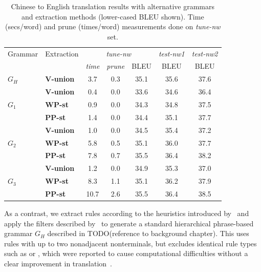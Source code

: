 \begin{table}
  \begin{center}
    \begin{tabular}{|l|l||c|c|c||c||c|}
      \hline
      Grammar & Extraction & \multicolumn{3}{|c||}{{\em tune-nw}} & {\em test-nw1} & {\em test-nw2} \\  \cline{3-7}
      &            & {\em time} & {\em prune} & BLEU & BLEU & BLEU \\ \hline
      $G_H$ & {\bf V-union} & 3.7 & 0.3 & 35.1 & 35.6 & 37.6  \\
      \hline
      & {\bf V-union} & 0.4 & 0.0 & 33.6 & 34.6 & 36.4  \\
      $G_1$ & {\bf WP-st} & 0.9 & 0.0  & 34.3 & 34.8 & 37.5  \\
      & {\bf PP-st} & 1.4 & 0.0 & 34.4 & 35.1 & 37.7   \\
      \hline
      & {\bf V-union} & 1.0 & 0.0 & 34.5  & 35.4  & 37.2   \\
      $G_2$ & {\bf WP-st} & 5.8 & 0.5 & 35.1 & 36.0  & 37.7   \\
      & {\bf PP-st} & 7.8 & 0.7 & 35.5 & 36.4  & 38.2   \\
      \hline
      & {\bf V-union} & 1.2 & 0.0 & 34.9 & 35.3  & 37.0   \\
      $G_3$ & {\bf WP-st} & 8.3 & 1.1 & 35.1  & 36.2  & 37.9   \\
      & {\bf PP-st} & 10.7 &  2.6  & 35.5 & 36.4  & 38.5  \\
      \hline
    \end{tabular}
    \caption{Chinese to English translation results with alternative grammars and extraction methods (lower-cased BLEU shown). Time (secs/word) and prune (times/word) measurements done on {\em tune-nw} set.}
    \label{tab:extractionFromPosteriorsTranslationResults}
  \end{center}
\end{table}
%
As a contrast, we extract rules according to the heuristics introduced
by~\citet{chiang:2007:CL} and apply the filters described
by~\citet{iglesias-degispert-banga-byrne:2009:EACL} to generate a standard
hierarchical phrase-based grammar $G_H$ described in TODO(reference to
background chapter). This uses rules with up to two nonadjacent
nonterminals, but excludes identical rule types such as \RT[$X$][$w~X$][$w~X$]
or \RT[$X$][$w~X_1~w~X_2$][$w~X_1~w~X_2$], which were reported to cause
computational difficulties without a clear improvement in
translation~\citep{iglesias-degispert-banga-byrne:2009:EACL}. 
    
